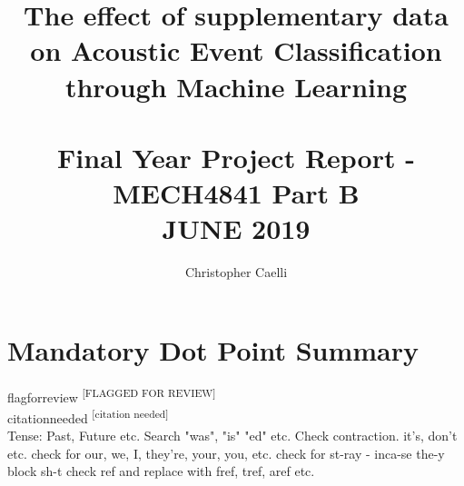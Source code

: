 \documentclass{UoNMCHA}
\newcommand{\citationneeded}{\textsuperscript{\color{blue} [citation needed]}}
\newcommand{\flagforreview}{\textsuperscript{\color{red} [FLAGGED FOR REVIEW]}}
\numberwithin{equation}{section}
\begin{document}
\title{The effect of supplementary data on Acoustic Event Classification through Machine Learning \\ \ \\
{\small Final Year Project Report - MECH4841 Part B  \\JUNE 2019}}
\author[UoNMCHA]{Christopher Caelli}
\address[UoNMCHA]{
Student of Mechatronics Engineering,\\
The University of Newcastle, Callaghan, NSW 2308, AUSTRALIA \\
E-mail: \href{mailto:Christopher.Caelli@uon.edu.au}{\textsf{Christopher.Caelli@uon.edu.au}}}
\maketitle
\onecolumn

\vspace{-5mm}
\section*{Mandatory Dot Point Summary}
\vspace{-3mm}

flagforreview \flagforreview \\
citationneeded \citationneeded \\
Tense: Past, Future etc. Search "was", "is" "ed" etc.
Check contraction. it's, don't etc.
check for our, we, I, they're, your, you, etc.
check for st-ray - inca-se the-y block sh-t
check ref and replace with fref, tref, aref etc.
\end{document}
